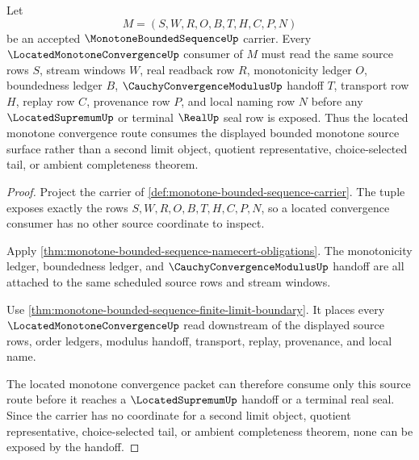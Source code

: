\begin{theorem}
\label{thm:monotone-bounded-sequence-located-convergence-source}
Let
$$
M=(S,W,R,O,B,T,H,C,P,N)
$$
be an accepted $\MonotoneBoundedSequenceUp$ carrier. Every $\LocatedMonotoneConvergenceUp$ consumer of $M$ must read the same source rows $S$, stream windows $W$, real readback row $R$, monotonicity ledger $O$, boundedness ledger $B$, $\CauchyConvergenceModulusUp$ handoff $T$, transport row $H$, replay row $C$, provenance row $P$, and local naming row $N$ before any $\LocatedSupremumUp$ or terminal $\RealUp$ seal row is exposed. Thus the located monotone convergence route consumes the displayed bounded monotone source surface rather than a second limit object, quotient representative, choice-selected tail, or ambient completeness theorem.
\end{theorem}
\begin{proof}
Project the carrier of \autoref{def:monotone-bounded-sequence-carrier}. The tuple exposes exactly the rows $S,W,R,O,B,T,H,C,P,N$, so a located convergence consumer has no other source coordinate to inspect.

Apply \autoref{thm:monotone-bounded-sequence-namecert-obligations}. The monotonicity ledger, boundedness ledger, and $\CauchyConvergenceModulusUp$ handoff are all attached to the same scheduled source rows and stream windows.

Use \autoref{thm:monotone-bounded-sequence-finite-limit-boundary}. It places every $\LocatedMonotoneConvergenceUp$ read downstream of the displayed source rows, order ledgers, modulus handoff, transport, replay, provenance, and local name.

The located monotone convergence packet can therefore consume only this source route before it reaches a $\LocatedSupremumUp$ handoff or a terminal real seal. Since the carrier has no coordinate for a second limit object, quotient representative, choice-selected tail, or ambient completeness theorem, none can be exposed by the handoff.
\end{proof}

